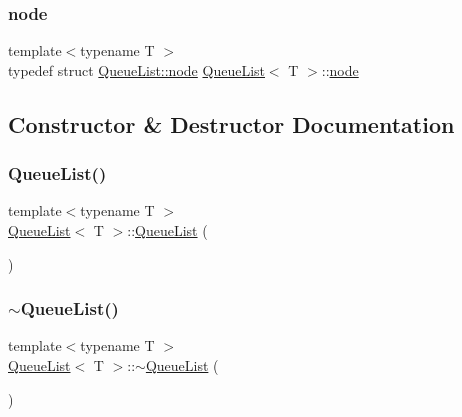 \mbox{\label{class_queue_list_a62281a4a1d5fd02f370c6dcae94559fe}} 
\subsubsection{\texorpdfstring{node}{node}}
{\footnotesize\ttfamily template$<$typename T $>$ \\
typedef struct \mbox{\hyperlink{struct_queue_list_1_1node}{Queue\+List\+::node}}  \mbox{\hyperlink{class_queue_list}{Queue\+List}}$<$ T $>$\+::\mbox{\hyperlink{struct_queue_list_1_1node}{node}}\hspace{0.3cm}{\ttfamily [private]}}



\subsection{Constructor \& Destructor Documentation}
\mbox{\label{class_queue_list_acdba0c9151f33fab7a805e49e8a4c52e}} 
\subsubsection{\texorpdfstring{Queue\+List()}{QueueList()}}
{\footnotesize\ttfamily template$<$typename T $>$ \\
\mbox{\hyperlink{class_queue_list}{Queue\+List}}$<$ T $>$\+::\mbox{\hyperlink{class_queue_list}{Queue\+List}} (\begin{DoxyParamCaption}{ }\end{DoxyParamCaption})}

\mbox{\label{class_queue_list_a6090ecbc97b1528ef41422cb922bd92e}} 
\subsubsection{\texorpdfstring{$\sim$\+Queue\+List()}{~QueueList()}}
{\footnotesize\ttfamily template$<$typename T $>$ \\
\mbox{\hyperlink{class_queue_list}{Queue\+List}}$<$ T $>$\+::$\sim$\mbox{\hyperlink{class_queue_list}{Queue\+List}} (\begin{DoxyParamCaption}{ }\end{DoxyParamCaption})}



